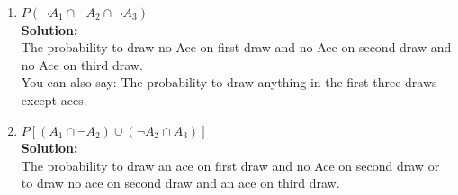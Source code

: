\documentclass[a4paper]{article}
\begin{document}
\begin{enumerate}
\begin{enumerate}
	
	
	\item $P(\neg A_1 \cap \neg A_2 \cap \neg A_3)$\\
	\textbf{Solution:}\\
		
The probability to draw no Ace on first draw and no Ace on second draw and no Ace on third draw.\\
You can also say: The probability to draw anything in the first three draws except aces.\\	
	
	\item $P\left[ (A_1 \cap \neg A_2)\cup (\neg A_2 \cap A_3) \right]$\\
	\textbf{Solution:}\\
	
The probability to draw an ace on first draw and no Ace on second draw or to draw no ace on second draw and an ace on third draw.\\	
	
	
\end{enumerate}

\end{enumerate}
\end{document}
